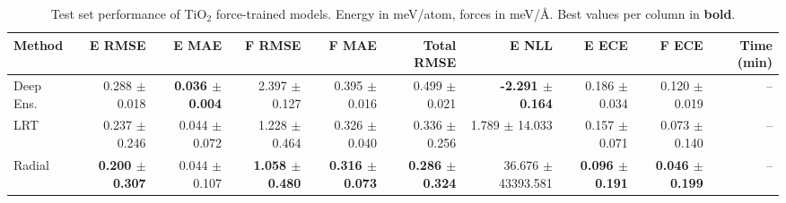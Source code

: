 \begin{table}
\centering
\caption{Test set performance of TiO$_2$ force-trained models. Energy in meV/atom, forces in meV/\AA{}. Best values per column in \textbf{bold}.}
\label{tab:tio2_results}
\begin{tabular}{lrrrrrrrrr}
\toprule
Method & E RMSE & E MAE & F RMSE & F MAE & Total RMSE & E NLL & E ECE & F ECE & Time (min) \\
\midrule
Deep Ens. & 0.288 $\pm$ 0.018 & \textbf{0.036 $\pm$ 0.004} & 2.397 $\pm$ 0.127 & 0.395 $\pm$ 0.016 & 0.499 $\pm$ 0.021 & \textbf{-2.291 $\pm$ 0.164} & 0.186 $\pm$ 0.034 & 0.120 $\pm$ 0.019 & -- \\
LRT & 0.237 $\pm$ 0.246 & 0.044 $\pm$ 0.072 & 1.228 $\pm$ 0.464 & 0.326 $\pm$ 0.040 & 0.336 $\pm$ 0.256 & 1.789 $\pm$ 14.033 & 0.157 $\pm$ 0.071 & 0.073 $\pm$ 0.140 & -- \\
Radial & \textbf{0.200 $\pm$ 0.307} & 0.044 $\pm$ 0.107 & \textbf{1.058 $\pm$ 0.480} & \textbf{0.316 $\pm$ 0.073} & \textbf{0.286 $\pm$ 0.324} & 36.676 $\pm$ 43393.581 & \textbf{0.096 $\pm$ 0.191} & \textbf{0.046 $\pm$ 0.199} & -- \\
\bottomrule
\end{tabular}
\end{table}